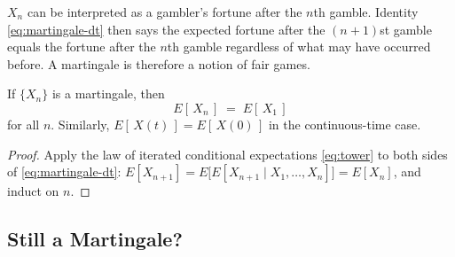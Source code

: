 $X_{n}$ can be interpreted as a gambler's fortune after the $n$th gamble.
Identity \eqref{eq:martingale-dt} then says the expected fortune after the $(n+1)$st gamble equals the fortune after the $n$th gamble regardless of what may have occurred before.
A martingale is therefore a notion of fair games.

\suppstart
{}
\suppend

\begin{proposition}
	If $\{X_{n}\}$ is a martingale, then
	\begin{equation}
		E[\,X_{n}\,] \;=\; E[\,X_{1}\,]
		\label{eq:martingale-mean}
	\end{equation}
	for all $n$.
	Similarly, $E[\,X(t)\,]=E[\,X(0)\,]$ in the continuous-time case.
\end{proposition}

\begin{proof}
	Apply the law of iterated conditional expectations \eqref{eq:tower} to both sides of \eqref{eq:martingale-dt}: $E[X_{n+1}]=E\bigl[E[X_{n+1}\mid X_{1},\dots,X_{n}]\bigr]=E[X_{n}]$, and induct on $n$.
\end{proof}

\suppstart
{}
\suppend

\subsection{Still a Martingale?}


